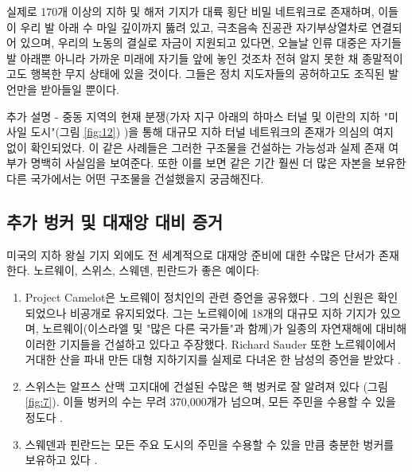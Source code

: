 \documentclass[10pt,twocolumn,letterpaper]{article}
\begin{document}
실제로 170개 이상의 지하 및 해저 기지가 대륙 횡단 비밀 네트워크로 존재하며, 이들이 우리 발 아래 수 마일 깊이까지 뚫려 있고, 극초음속 진공관 자기부상열차로 연결되어 있으며, 우리의 노동의 결실로 자금이 지원되고 있다면, 오늘날 인류 대중은 자기들 발 아래뿐 아니라 가까운 미래에 자기들 앞에 놓인 것조차 전혀 알지 못한 채 종말적이고도 행복한 무지 상태에 있을 것이다. 그들은 정치 지도자들의 공허하고도 조직된 발언만을 받아들일 뿐이다.

추가 설명 - 중동 지역의 현재 분쟁(가자 지구 아래의 하마스 터널\cite{38} 및 이란의 지하 "미사일 도시"(그림 \ref{fig:12}) \cite{39,40})을 통해 대규모 지하 터널 네트워크의 존재가 의심의 여지 없이 확인되었다. 이 같은 사례들은 그러한 구조물을 건설하는 가능성과 실제 존재 여부가 명백히 사실임을 보여준다. 또한 이를 보면 같은 기간 훨씬 더 많은 자본을 보유한 다른 국가에서는 어떤 구조물을 건설했을지 궁금해진다.

\subsection{추가 벙커 및 대재앙 대비 증거}

미국의 지하 왕실 기지 외에도 전 세계적으로 대재앙 준비에 대한 수많은 단서가 존재한다. 노르웨이, 스위스, 스웨덴, 핀란드가 좋은 예이다:

\begin{flushleft}
\begin{enumerate}
    \item Project Camelot은 노르웨이 정치인의 관련 증언을 공유했다 \cite{25,26}. 그의 신원은 확인되었으나 비공개로 유지되었다. 그는 노르웨이에 18개의 대규모 지하 기지가 있으며, 노르웨이(이스라엘 및 "많은 다른 국가들"과 함께)가 일종의 자연재해에 대비해 이러한 기지들을 건설하고 있다고 주장했다. Richard Sauder 또한 노르웨이에서 거대한 산을 파내 만든 대형 지하기지를 실제로 다녀온 한 남성의 증언을 받았다 \cite{22}.
    \item 스위스는 알프스 산맥 고지대에 건설된 수많은 핵 벙커로 잘 알려져 있다 (그림 \ref{fig:7}). 이들 벙커의 수는 무려 370,000개가 넘으며, 모든 주민을 수용할 수 있을 정도다 \cite{27}.
    \item 스웨덴과 핀란드는 모든 주요 도시의 주민을 수용할 수 있을 만큼 충분한 벙커를 보유하고 있다 \cite{27}.
\end{enumerate}
\end{flushleft}
\end{document}
